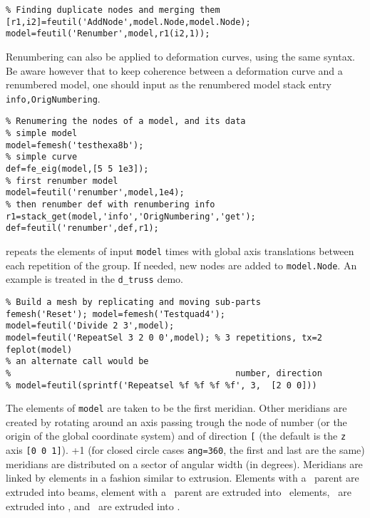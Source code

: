 \begin{verbatim}
% Finding duplicate nodes and merging them
[r1,i2]=feutil('AddNode',model.Node,model.Node);
model=feutil('Renumber',model,r1(i2,1));
\end{verbatim}

Renumbering can also be applied to deformation curves, using the same syntax. Be aware however that to keep coherence between a deformation curve and a renumbered model, one should input  as the renumbered model stack entry {\tt info,OrigNumbering}.

\begin{verbatim}
% Renumering the nodes of a model, and its data
% simple model
model=femesh('testhexa8b');
% simple curve
def=fe_eig(model,[5 5 1e3]);
% first renumber model
model=feutil('renumber',model,1e4);
% then renumber def with renumbering info
r1=stack_get(model,'info','OrigNumbering','get');
def=feutil('renumber',def,r1);
\end{verbatim}%


  repeats the elements of input {\tt model}  times with global axis translations  between each repetition of the group. If needed, new nodes are added to {\tt model.Node}. An example is treated in the {\tt d\_truss} demo. 

\begin{verbatim}
% Build a mesh by replicating and moving sub-parts
femesh('Reset'); model=femesh('Testquad4');
model=feutil('Divide 2 3',model); 
model=feutil('RepeatSel 3 2 0 0',model); % 3 repetitions, tx=2
feplot(model)
% an alternate call would be
%                                            number, direction
% model=feutil(sprintf('Repeatsel %f %f %f %f', 3,  [2 0 0]))
\end{verbatim}%


 The elements of {\tt model} are taken to be the first meridian. Other meridians are created by rotating around an axis passing trough the node of number  (or the origin of the global coordinate system) and of direction {\tt [}\tsi{nx ny nz}{\tt ]} (the default is the {\tt z} axis {\tt [0 0 1]}). +1 (for closed circle cases {\tt ang=360}, the first and last are the same) meridians are distributed on a sector of angular width  (in degrees). Meridians are linked by elements in a fashion similar to extrusion. Elements with a \mass\ parent are extruded into beams, element with a \beam\ parent are extruded into \quada\ elements, \quada\ are extruded into \hexah, and \quadb\ are extruded into \hexav.

